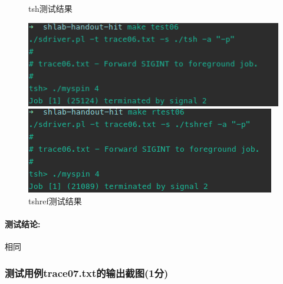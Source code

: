 \begin{figure}[H]
    \begin{minipage}[c]{0.5\linewidth}
        \centering
        \caption{tsh测试结果}
        \includegraphics[width=0.7\linewidth]{figures/test06.png}
    \end{minipage}
    \begin{minipage}[c]{0.5\linewidth}
        \centering
        \caption{tshref测试结果}
        \includegraphics[width=0.7\linewidth]{figures/rtest06.png}
    \end{minipage}
\end{figure}

\paragraph{测试结论:}相同

\subsubsection{测试用例trace07.txt的输出截图(1分)}

